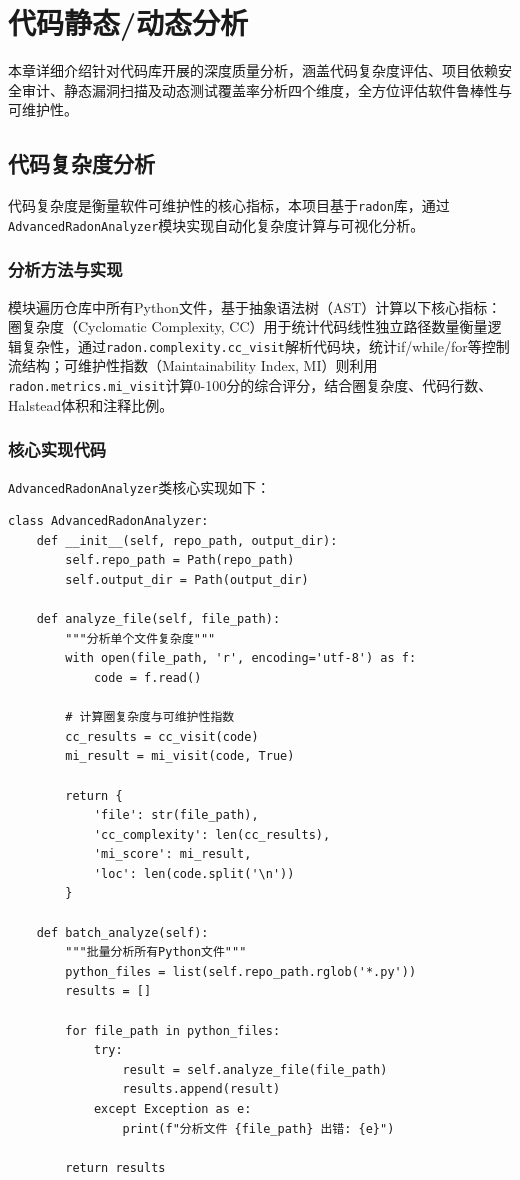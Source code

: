 \chapter{代码静态/动态分析}
\label{chap02}

本章详细介绍针对代码库开展的深度质量分析，涵盖代码复杂度评估、项目依赖安全审计、静态漏洞扫描及动态测试覆盖率分析四个维度，全方位评估软件鲁棒性与可维护性。

\section{代码复杂度分析}

代码复杂度是衡量软件可维护性的核心指标，本项目基于\texttt{radon}库，通过\texttt{AdvancedRadonAnalyzer}模块实现自动化复杂度计算与可视化分析。

\subsection{分析方法与实现}
模块遍历仓库中所有Python文件，基于抽象语法树（AST）计算以下核心指标：圈复杂度（Cyclomatic Complexity, CC）用于统计代码线性独立路径数量衡量逻辑复杂性，通过\texttt{radon.complexity.cc\_visit}解析代码块，统计if/while/for等控制流结构；可维护性指数（Maintainability Index, MI）则利用\texttt{radon.metrics.mi\_visit}计算0-100分的综合评分，结合圈复杂度、代码行数、Halstead体积和注释比例。

\subsection{核心实现代码}
\texttt{AdvancedRadonAnalyzer}类核心实现如下：

\begin{verbatim}
class AdvancedRadonAnalyzer:
    def __init__(self, repo_path, output_dir):
        self.repo_path = Path(repo_path)
        self.output_dir = Path(output_dir)

    def analyze_file(self, file_path):
        """分析单个文件复杂度"""
        with open(file_path, 'r', encoding='utf-8') as f:
            code = f.read()

        # 计算圈复杂度与可维护性指数
        cc_results = cc_visit(code)
        mi_result = mi_visit(code, True)

        return {
            'file': str(file_path),
            'cc_complexity': len(cc_results),
            'mi_score': mi_result,
            'loc': len(code.split('\n'))
        }

    def batch_analyze(self):
        """批量分析所有Python文件"""
        python_files = list(self.repo_path.rglob('*.py'))
        results = []

        for file_path in python_files:
            try:
                result = self.analyze_file(file_path)
                results.append(result)
            except Exception as e:
                print(f"分析文件 {file_path} 出错: {e}")

        return results
\end{verbatim}

